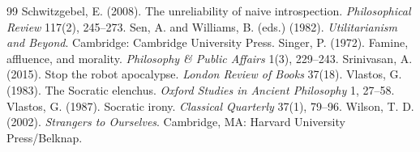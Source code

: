 \documentclass[11pt]{article}
\theoremstyle{definition}
\theoremstyle{remark}
\begin{document}
\begin{thebibliography}{99}
 Schwitzgebel, E. (2008). The unreliability of naive introspection. \emph{Philosophical Review} 117(2), 245--273.
 Sen, A. and Williams, B. (eds.) (1982). \emph{Utilitarianism and Beyond}. Cambridge: Cambridge University Press.
 Singer, P. (1972). Famine, affluence, and morality. \emph{Philosophy \& Public Affairs} 1(3), 229--243.
 Srinivasan, A. (2015). Stop the robot apocalypse. \emph{London Review of Books} 37(18).
 Vlastos, G. (1983). The Socratic elenchus. \emph{Oxford Studies in Ancient Philosophy} 1, 27--58.
 Vlastos, G. (1987). Socratic irony. \emph{Classical Quarterly} 37(1), 79--96.
 Wilson, T. D. (2002). \emph{Strangers to Ourselves}. Cambridge, MA: Harvard University Press/Belknap.
\end{thebibliography}
\end{document}
